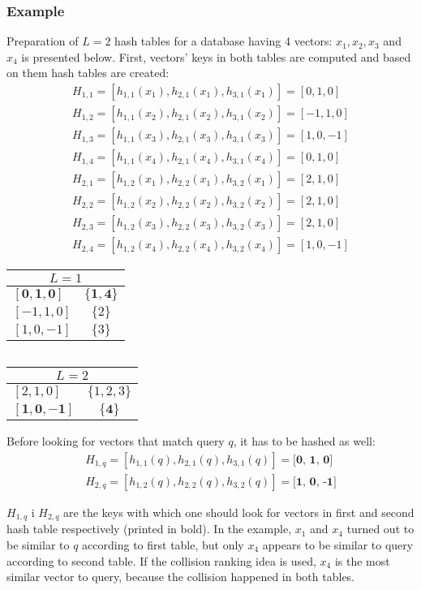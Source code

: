 \subsubsection*{Example}
Preparation of $L = 2$ hash tables for a database having 4 vectors:
$x_1, x_2, x_3$ and $x_4$ is presented below.
First, vectors' keys in both tables are computed and based on them hash tables are created:
\begin{gather*}
H_{1,1} = [h_{1,1}(x_1), h_{2,1}(x_1), h_{3,1}(x_1)] = [0, 1, 0]\\
H_{1,2} = [h_{1,1}(x_2), h_{2,1}(x_2), h_{3,1}(x_2)] = [-1, 1, 0]\\
H_{1,3} = [h_{1,1}(x_3), h_{2,1}(x_3), h_{3,1}(x_3)] = [1, 0, -1]\\
H_{1,4} = [h_{1,1}(x_4), h_{2,1}(x_4), h_{3,1}(x_4)] = [0, 1, 0]\\
H_{2,1} = [h_{1,2}(x_1), h_{2,2}(x_1), h_{3,2}(x_1)] = [2, 1, 0]\\
H_{2,2} = [h_{1,2}(x_2), h_{2,2}(x_2), h_{3,2}(x_2)] = [2, 1, 0]\\
H_{2,3} = [h_{1,2}(x_3), h_{2,2}(x_3), h_{3,2}(x_3)] = [2, 1, 0]\\
H_{2,4} = [h_{1,2}(x_4), h_{2,2}(x_4), h_{3,2}(x_4)] = [1, 0, -1]
\end{gather*}
\renewcommand{\arraystretch}{1.2}
\begin{center}
\begin{tabular}{|l|c|}
\hline
\multicolumn{2}{|c|}{$L = 1$} \\
\hline
$\bm{[0, 1, 0]}$ & $\bm{\{1, 4\}}$ \\
\hline
$[-1, 1, 0]$ & $\{2\}$ \\
\hline
$[1, 0, -1]$ & $\{3\}$ \\
\hline
\end{tabular}
$\ \ \ \ $
\begin{tabular}{|l|c|}
\hline
\multicolumn{2}{|c|}{$L = 2$} \\
\hline
$[2, 1, 0]$ & $\{1, 2, 3\}$ \\
\hline
$\bm{[1, 0, -1]}$ & $\bm{\{4\}}$ \\
\hline
\end{tabular}
\end{center}

Before looking for vectors that match query $q$, it has to be hashed as well:
\begin{gather*}
H_{1,q} = [h_{1,1}(q), h_{2,1}(q), h_{3,1}(q)] = \textbf{[0, 1, 0]}\\
H_{2,q} = [h_{1,2}(q), h_{2,2}(q), h_{3,2}(q)] = \textbf{[1, 0, -1]}
\end{gather*}

$H_{1,q}$ i $H_{2,q}$ are the keys with which one should look for vectors in first and second hash table respectively (printed in bold).
In the example, $x_1$ and $x_4$ turned out to be similar to $q$ according to first table, but only $x_4$ appears to be similar to query according to second table.
If the collision ranking idea is used, $x_4$ is the most similar vector to query, because the collision happened in both tables.
